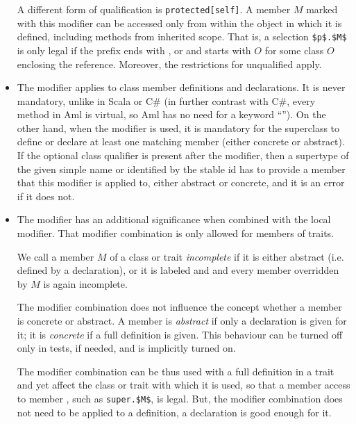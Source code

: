 \begin{itemize}
  A different form of qualification is \lstinline!protected[self]!. A member $M$ marked with this modifier can be accessed only from within the object in which it is defined, including methods from inherited scope. That is, a selection \lstinline!$p$.$M$! is only legal if the prefix ends with ,  or  and starts with $O$ for some class $O$ enclosing the reference. Moreover, the restrictions for unqualified  apply. 

  \item The  modifier applies to class member definitions and declarations. It is never mandatory, unlike in Scala or C\# (in further contrast with C\#, every method in Aml is virtual, so Aml has no need for a keyword ``''). On the other hand, when the modifier is used, it is mandatory for the superclass to define or declare at least one matching member (either concrete or abstract). If the optional class qualifier is present after the  modifier, then a supertype of the given simple name or identified by the stable id has to provide a member that this modifier is applied to, either abstract or concrete, and it is an error if it does not. 

  \item The  modifier has an additional significance when combined with the  local modifier. That modifier combination is only allowed for members of traits. 

  We call a member $M$ of a class or trait {\em incomplete} if it is either abstract (i.e. defined by a declaration), or it is labeled  and  and every member overridden by $M$ is again incomplete. 

  The  modifier combination does not influence the concept whether a member is concrete or abstract. A member is {\em abstract} if only a declaration is given for it; it is {\em concrete} if a full definition is given. This behaviour can be turned off only in tests, if needed, and is implicitly turned on. 

  The  modifier combination can be thus used with a full definition in a trait and yet affect the class or trait with which it is used, so that a member access to member , such as \lstinline!super.$M$!, is legal. But, the  modifier combination does not need to be applied to a definition, a declaration is good enough for it. 


\end{itemize}
